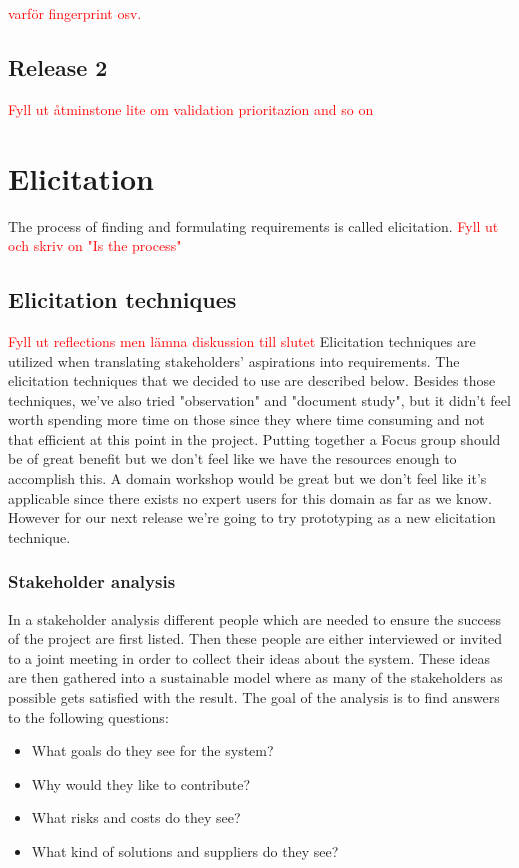 \documentclass[10pt]{article}
\newcommand\todo[1]{\textcolor{red}{#1}}
\begin{document}
\todo{varför fingerprint osv.}

\subsection{Release 2}
\todo{Fyll ut åtminstone lite om validation prioritazion and so on}

\section{Elicitation}
\sloppy
\noindent The process of finding and formulating requirements is called elicitation.
\todo{Fyll ut och skriv on "Is the process"}

\subsection{Elicitation techniques}
\todo{Fyll ut reflections men lämna diskussion till slutet}
Elicitation techniques are utilized when translating stakeholders' aspirations into requirements.
The elicitation techniques that we decided to use are described below.
Besides those techniques, we've also tried "observation" and "document study", but it didn't feel worth spending more time on those since they where time consuming and not that efficient at this point in the project.
Putting together a Focus group should be of great benefit but we don’t feel like we have the resources enough to accomplish this.
A domain workshop would be great but we don't feel like it's applicable since there exists no expert users for this domain as far as we know.
However for our next release we're going to try prototyping as a new elicitation technique.

\subsubsection{Stakeholder analysis}
In a stakeholder analysis different people which are needed to ensure the success of the project are first listed. Then these people are either interviewed or invited to a joint meeting in order to collect their ideas about the system. These ideas are then gathered into a sustainable model where as many of the stakeholders as possible gets satisfied with the result. The goal of the analysis is to find answers to the following questions:
\begin{itemize}
\item What goals do they see for the system?
\item Why would they like to contribute?
\item What risks and costs do they see?
\item What kind of solutions and suppliers do they see?
\end{itemize}
\end{document}
